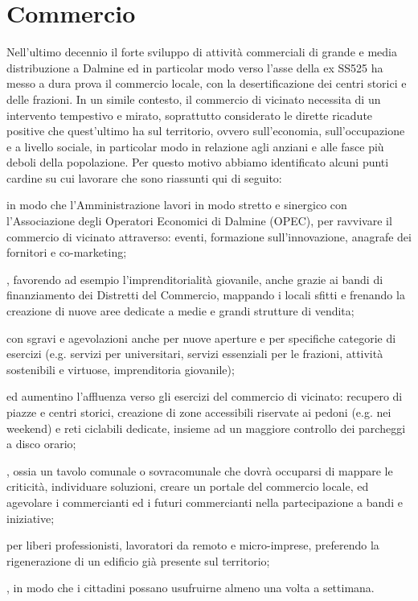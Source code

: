 \section{Commercio}
Nell'ultimo decennio il forte sviluppo di attività commerciali di grande e media distribuzione a Dalmine ed in particolar modo verso l'asse della ex SS525 ha messo a dura prova il commercio locale, con la desertificazione dei centri storici e delle frazioni. In un simile contesto, il commercio di vicinato necessita di un intervento tempestivo e mirato, soprattutto considerato le dirette ricadute positive che quest'ultimo ha sul territorio, ovvero sull'economia, sull'occupazione e a livello sociale, in particolar modo in relazione agli anziani e alle fasce più deboli della popolazione.
Per questo motivo abbiamo identificato alcuni punti cardine su cui lavorare che sono riassunti qui di seguito:

 in modo che l'Amministrazione lavori in modo stretto e sinergico con l'Associazione degli Operatori Economici di Dalmine (OPEC), per ravvivare il commercio di vicinato attraverso: eventi, formazione sull'innovazione, anagrafe dei fornitori e co-marketing;

, favorendo ad esempio l'imprenditorialità giovanile, anche grazie ai bandi di finanziamento dei Distretti del Commercio, mappando i locali sfitti e frenando la creazione di nuove aree dedicate a medie e grandi strutture di vendita;

 con sgravi e agevolazioni anche per nuove aperture e per specifiche categorie di esercizi (e.g. servizi per universitari, servizi essenziali per le frazioni, attività sostenibili e virtuose, imprenditoria giovanile);

 ed aumentino l'affluenza verso gli esercizi del commercio di vicinato: recupero di piazze e centri storici, creazione di zone accessibili riservate ai pedoni (e.g. nei weekend) e reti ciclabili dedicate, insieme ad un maggiore controllo dei parcheggi a disco orario;

, ossia un tavolo comunale o sovracomunale che dovrà occuparsi di mappare le criticità, individuare soluzioni, creare un portale del commercio locale, ed agevolare i commercianti ed i futuri commercianti nella partecipazione a bandi e iniziative;

 per liberi professionisti, lavoratori da remoto e micro-imprese, preferendo la rigenerazione di un edificio già presente sul territorio;

, in modo che i cittadini possano usufruirne almeno una volta a settimana.
